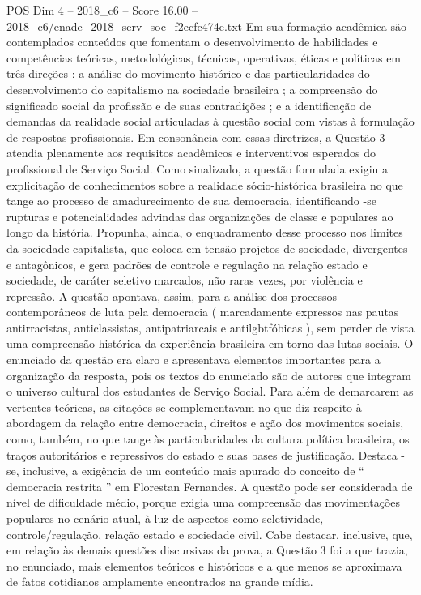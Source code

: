 \begin{textsample}{POS Dim 4 – 2018\_c6 – Score 16.00 – 2018\_c6/enade\_2018\_serv\_soc\_f2ecfc474e.txt}
Em sua formação acadêmica são contemplados conteúdos que fomentam o desenvolvimento de habilidades e competências teóricas, metodológicas, técnicas, operativas, éticas e políticas em três direções : a análise do movimento histórico e das particularidades do desenvolvimento do capitalismo na sociedade brasileira ; a compreensão do significado social da profissão e de suas contradições ; e a identificação de demandas da realidade social articuladas à questão social com vistas à formulação de respostas profissionais.
Em consonância com essas diretrizes, a Questão 3 atendia plenamente aos requisitos acadêmicos e interventivos esperados do profissional de Serviço Social.
Como sinalizado, a questão formulada exigiu a explicitação de conhecimentos sobre a realidade sócio-histórica brasileira no que tange ao processo de amadurecimento de sua democracia, identificando -se rupturas e potencialidades advindas das organizações de classe e populares ao longo da história.
Propunha, ainda, o enquadramento desse processo nos limites da sociedade capitalista, que coloca em tensão projetos de sociedade, divergentes e antagônicos, e gera padrões de controle e regulação na relação estado e sociedade, de caráter seletivo marcados, não raras vezes, por violência e repressão.
A questão apontava, assim, para a análise dos processos contemporâneos de luta pela democracia ( marcadamente expressos nas pautas antirracistas, anticlassistas, antipatriarcais e antilgbtfóbicas ), sem perder de vista uma compreensão histórica da experiência brasileira em torno das lutas sociais.
O enunciado da questão era claro e apresentava elementos importantes para a organização da resposta, pois os textos do enunciado são de autores que integram o universo cultural dos estudantes de Serviço Social.
Para além de demarcarem as vertentes teóricas, as citações se complementavam no que diz respeito à abordagem da relação entre democracia, direitos e ação dos movimentos sociais, como, também, no que tange às particularidades da cultura política brasileira, os traços autoritários e repressivos do estado e suas bases de justificação.
Destaca -se, inclusive, a exigência de um conteúdo mais apurado do conceito de “ democracia restrita ” em Florestan Fernandes.
A questão pode ser considerada de nível de dificuldade médio, porque exigia uma compreensão das movimentações populares no cenário atual, à luz de aspectos como seletividade, controle/regulação, relação estado e sociedade civil.
Cabe destacar, inclusive, que, em relação às demais questões discursivas da prova, a Questão 3 foi a que trazia, no enunciado, mais elementos teóricos e históricos e a que menos se aproximava de fatos cotidianos amplamente encontrados na grande mídia.

\end{textsample}
